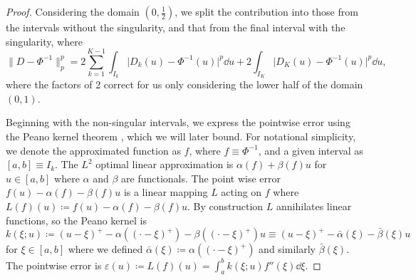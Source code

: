 \documentclass[manuscript,review]{acmart}
\begin{document}
\begin{proof}
Considering the domain $ (0, \tfrac{1}{2}) $, we split the contribution into those from the intervals without the singularity, and that from the final interval with the singularity, where
\begin{equation*}
\lVert D - \Phi^{-1}\rVert_p^p   = 2  \sum_{k=1}^{K-1} \int_{I_k} \lvert D_k(u) - \Phi^{-1}(u)\rvert^p \dd{u}  + 2 \int_{I_K} \lvert D_K(u) - \Phi^{-1}(u)\rvert^p \dd{u},
\end{equation*}
where the factors of 2 correct for us only considering the lower half of the domain $ (0, 1) $. 

Beginning with the non-singular intervals, we express the pointwise error using the Peano kernel theorem \citep{iserles2009first,powell1981approximation}, which we will later bound. For notational simplicity, we denote the approximated function as $ f $, where $ f \equiv \Phi^{-1} $, and a given interval as $ [a,b] \equiv I_k  $. The $ L^2 $ optimal linear approximation is $ \alpha(f) + \beta(f) u $ for $ u \in [a,b] $ where $ \alpha $ and $ \beta $ are functionals. The point wise error $ f(u) - \alpha(f) - \beta(f)u $ is a linear mapping $ L $ acting on $ f $ where $ L(f)(u) \coloneqq  f(u) - \alpha(f) - \beta(f)u $. By construction $ L $ annihilates linear functions, so the Peano kernel is $ k(\xi; u) \coloneqq (u - \xi)^+ - \alpha((\cdot - \xi)^+) - \beta((\cdot - \xi)^+)u \equiv (u - \xi)^+ - \bar{\alpha}(\xi) - \bar{\beta}(\xi)u $ for $ \xi \in [a,b] $ where we defined $ \bar{\alpha}(\xi) \coloneqq \alpha((\cdot - \xi)^+) $ and similarly $ \bar{\beta}(\xi) $. The pointwise error is $ \varepsilon(u) \coloneqq L(f)(u) = \int_{a}^{b} k(\xi; u) f''(\xi) \dd{\xi} $.


\end{proof}
\end{document}
